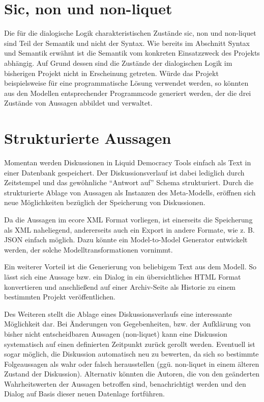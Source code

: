 \documentclass[11pt,a4paper,bibtotocnumbered]{scrreprt}
\begin{document}
\section{Sic, non und non-liquet} %
Die für die dialogische Logik charakteristischen Zustände sic, non und non-liquet sind Teil der Semantik und nicht der Syntax. Wie bereits im Abschnitt Syntax und Semantik erwähnt ist die Semantik vom konkreten Einsatzzweck des Projekts abhängig. Auf Grund dessen sind die Zustände der dialogischen Logik im bisherigen Projekt nicht in Erscheinung getreten. Würde das Projekt beispielsweise für eine programmatische Lösung verwendet werden, so könnten aus den Modellen entsprechender Programmcode generiert werden, der die drei Zustände von Aussagen abbildet und verwaltet.

\section{Strukturierte Aussagen} %

Momentan werden Diskussionen in Liquid Democracy Tools einfach als Text in einer Datenbank gespeichert.
Der Diskussionsverlauf ist dabei lediglich durch Zeitstempel und das gewöhnliche \enquote{Antwort auf} Schema strukturiert.
Durch die strukturierte Ablage von Aussagen als Instanzen des Meta-Modells, eröffnen sich neue Möglichkeiten bezüglich der Speicherung von Diskussionen.

Da die Aussagen im ecore XML Format vorliegen, ist einerseits die Speicherung als XML naheliegend, andererseits auch ein Export in andere Formate, wie z. B. JSON einfach möglich.
Dazu könnte ein Model-to-Model Generator entwickelt werden, der solche Modelltransformationen vornimmt.

Ein weiterer Vorteil ist die Generierung von beliebigem Text aus dem Modell.
So lässt sich eine Aussage bzw. ein Dialog in ein übersichtliches HTML Format konvertieren und anschließend auf einer Archiv-Seite als Historie zu einem bestimmten Projekt veröffentlichen.

Des Weiteren stellt die Ablage eines Diskussionsverlaufs eine interessante Möglichkeit dar.
Bei Änderungen von Gegebenheiten, bzw. der Aufklärung von bisher nicht entscheidbaren Aussagen (non-liquet) kann eine Diskussion systematisch auf einen definierten Zeitpunkt zurück gerollt werden.
Eventuell ist sogar möglich, die Diskussion automatisch neu zu bewerten, da sich so bestimmte Folgeaussagen als wahr oder falsch herausstellen (ggü. non-liquet in einem älteren Zustand der Diskussion).
Alternativ könnten die Autoren, die von den geänderten Wahrheitswerten der Aussagen betroffen sind, benachrichtigt werden und den Dialog auf Basis dieser neuen Datenlage fortführen.
\end{document}
